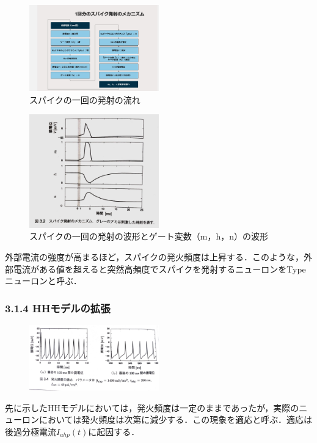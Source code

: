 \documentclass[dvipdfmx, A4j, twocolumn, 10.5pt]{jsarticle}
\begin{document}
\begin{figure}[h]
    \centering
    \includegraphics[width=0.5\textwidth]{images/flow.jpg}
    \caption{スパイクの一回の発射の流れ}
\end{figure}


\begin{figure}[h]
    \centering
    \includegraphics[width=0.5\textwidth]{images/spike1.pdf}
    \caption{スパイクの一回の発射の波形とゲート変数（m，h，n）の波形}
\end{figure}


外部電流の強度が高まるほど，スパイクの発火頻度は上昇する．このような，外部電流がある値を超えると突然高頻度でスパイクを発射するニューロンをType  ニューロンと呼ぶ．




\subsubsection*{3.1.4 HHモデルの拡張}

\begin{figure}[h]
    \centering
    \includegraphics[width=0.5\textwidth]{images/tekio.pdf}
\end{figure}
先に示したHHモデルにおいては，発火頻度は一定のままであったが，実際のニューロンにおいては発火頻度は次第に減少する．この現象を適応と呼ぶ．適応は後過分極電流$I_{ahp}(t)$に起因する．
\end{document}
